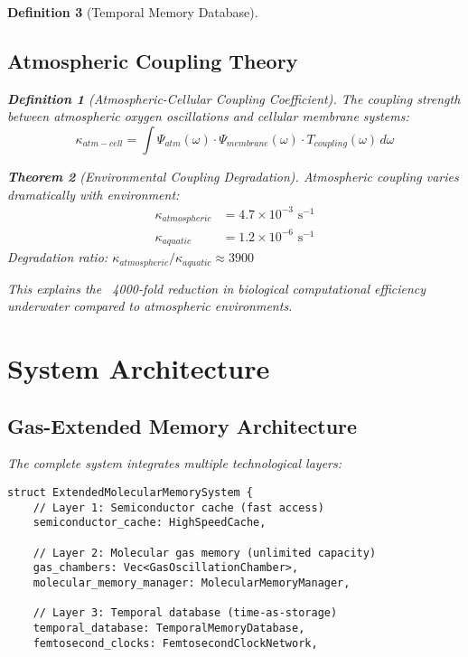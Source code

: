 \documentclass[12pt]{article}
\newtheorem{theorem}{Theorem}[section]
\newtheorem{definition}[theorem]{Definition}
\begin{document}
\begin{definition}[Temporal Memory Database]
\subsection{Atmospheric Coupling Theory}

\begin{definition}[Atmospheric-Cellular Coupling Coefficient]
The coupling strength between atmospheric oxygen oscillations and cellular membrane systems:
\begin{equation}
\kappa_{atm-cell} = \int \Psi_{atm}(\omega) \cdot \Psi_{membrane}(\omega) \cdot T_{coupling}(\omega) \, d\omega
\end{equation}
\end{definition}

\begin{theorem}[Environmental Coupling Degradation]
Atmospheric coupling varies dramatically with environment:
\begin{align}
\kappa_{atmospheric} &= 4.7 \times 10^{-3} \text{ s}^{-1} \\
\kappa_{aquatic} &= 1.2 \times 10^{-6} \text{ s}^{-1}
\end{align}
Degradation ratio: $\kappa_{atmospheric}/\kappa_{aquatic} \approx 3900$
\end{theorem}

This explains the ~4000-fold reduction in biological computational efficiency underwater compared to atmospheric environments.

\section{System Architecture}

\subsection{Gas-Extended Memory Architecture}

The complete system integrates multiple technological layers:

\begin{lstlisting}[caption=Extended Memory System Architecture]
struct ExtendedMolecularMemorySystem {
    // Layer 1: Semiconductor cache (fast access)
    semiconductor_cache: HighSpeedCache,
    
    // Layer 2: Molecular gas memory (unlimited capacity)  
    gas_chambers: Vec<GasOscillationChamber>,
    molecular_memory_manager: MolecularMemoryManager,
    
    // Layer 3: Temporal database (time-as-storage)
    temporal_database: TemporalMemoryDatabase,
    femtosecond_clocks: FemtosecondClockNetwork,
    

\end{lstlisting}
\end{definition}
\end{document}
